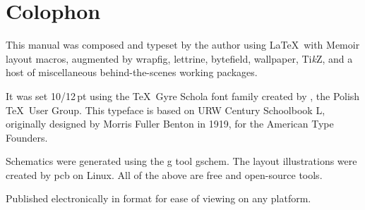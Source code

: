 \chapter{Colophon}
This manual was composed and typeset by the author using \LaTeX\ with Memoir layout macros,
augmented by wrapfig, lettrine, bytefield, wallpaper, Ti\emph{k}Z,
and a host of miscellaneous behind-the-scenes working packages.

It was set 10/12\,pt using the \TeX\ Gyre Schola font family created by , the
Polish \TeX\ User Group.  This typeface is based on URW Century Schoolbook L,
originally designed by Morris Fuller Benton in 1919, for the American Type Founders. 

Schematics were generated using the g tool {\ttfamily gschem}. The  layout
illustrations were created by {\ttfamily pcb} on Linux.  All of the above are free and open-source
tools.

Published electronically in  format for ease of viewing on any platform.
